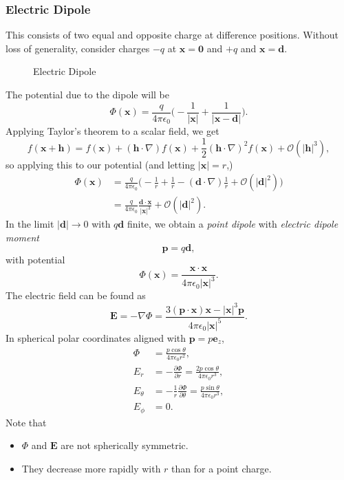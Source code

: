 \documentclass[12pt]{article}
\begin{document}
\subsubsection{Electric Dipole}
\label{subsub:electric_dipole}

This consists of two equal and opposite charge at difference positions. Without loss of generality, consider charges $-q$ at $\mathbf{x} = \mathbf{0}$ and $+q$ and $\mathbf{x} = \mathbf{d}$.

\begin{figure}[h]
	\centering
	\caption{Electric Dipole}
	\label{fig:electric_dipole}
	\vspace{1em}
\end{figure}

The potential due to the dipole will be
\[
\Phi(\mathbf{x}) = \frac{q}{4 \pi \epsilon_0} \biggl( - \frac{1}{|\mathbf{x}|} + \frac{1}{|\mathbf{x} - \mathbf{d}|} \biggr)
.\]
Applying Taylor's theorem to a scalar field, we get
\[
f(\mathbf{x} + \mathbf{h}) = f(\mathbf{x}) + (\mathbf{h} \cdot \nabla) f(\mathbf{x}) + \frac{1}{2} (\mathbf{h} \cdot \nabla)^2 f(\mathbf{x}) + \mathcal{O}(|\mathbf{h}|^3)
,\]
so applying this to our potential (and letting $|\mathbf{x}| = r$,)
\begin{align*}
	\Phi(\mathbf{x}) &= \frac{q}{4 \pi \epsilon_0} \biggl( -\frac{1}{r} + \frac{1}{r} - (\mathbf{d} \cdot \nabla) \frac{1}{r} + \mathcal{O}(|\mathbf{d}|^2)\biggr) \\
			 &= \frac{q}{4 \pi \epsilon_0} \frac{\mathbf{d} \cdot \mathbf{x}}{|\mathbf{x}|^3} + \mathcal{O}(|\mathbf{d}|^2).
\end{align*}
In the limit $|\mathbf{d}| \to 0$ with $q \mathbf{d}$ finite, we obtain a \emph{point dipole} with \emph{electric dipole moment}
\[
\mathbf{p} = q \mathbf{d}
,\]
with potential
\[
\Phi(\mathbf{x}) = \frac{\mathbf{x} \cdot \mathbf{x}}{4 \pi \epsilon_0 |\mathbf{x}|^3}
.\]
The electric field can be found as
\[
\mathbf{E} = - \nabla \Phi = \frac{3(\mathbf{p} \cdot \mathbf{x})\mathbf{x} - |\mathbf{x}|^3 \mathbf{p}}{4 \pi \epsilon_0 |\mathbf{x}|^{5}}
.\]
In spherical polar coordinates aligned with $\mathbf{p}= p \mathbf{e}_z$,
\begin{align*}
	\Phi &= \frac{p \cos \theta}{4 \pi \epsilon_0 r^2}, \\
	E_r &= - \frac{\partial \Phi}{\partial r} = \frac{2 p \cos \theta}{4 \pi \epsilon_0 r^3}, \\
	E_\theta &= - \frac{1}{r} \frac{\partial \Phi}{\partial \theta} = \frac{p \sin \theta}{4 \pi \epsilon_0 r^3}, \\
	E_\phi &= 0.
\end{align*}
Note that
\begin{itemize}
	\item $\Phi$ and $\mathbf{E}$ are not spherically symmetric.
	\item They decrease more rapidly with $r$ than for a point charge.
\end{itemize}
\end{document}
